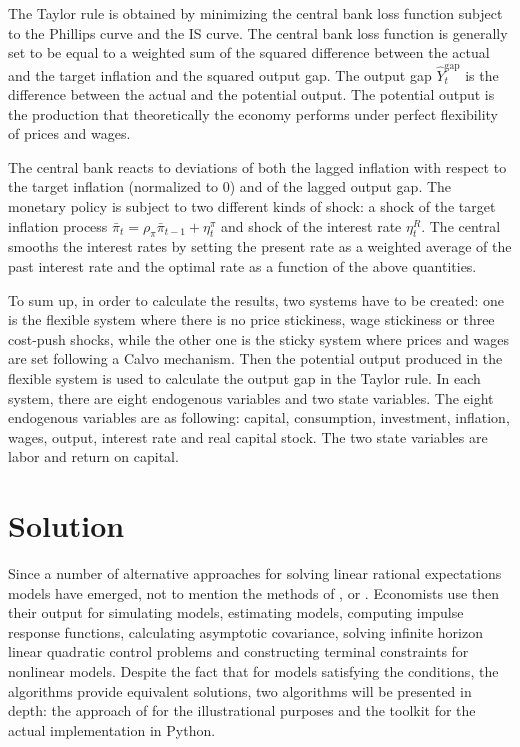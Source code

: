 \documentclass{pracamgr}
\numberwithin{equation}{section}
\begin{document}
The Taylor rule is obtained by minimizing the central bank loss function subject to the Phillips curve and the IS curve. The central bank loss function is generally set to be equal to a weighted sum of the squared difference between the actual and the target inflation and the squared output gap. The output gap $\hat{Y}_{t}^{\text{gap}}$ is the difference between the actual and the potential output. The potential output is the production that theoretically the economy performs under perfect flexibility of prices and wages.

The central bank reacts to deviations of both the lagged inflation with respect to the target inflation (normalized to 0) and of the lagged output gap. The monetary policy is subject to two different kinds of shock: a shock of the target inflation process $ \bar{\pi}_{t} = \rho_{\pi} \bar{\pi}_{t-1} + \eta_{t}^{\pi}$ and shock
of the interest rate $\eta_{t}^{R}$. The central smooths the interest rates by setting the present rate as a weighted average of the past interest rate and the optimal rate as a function of the above quantities.

To sum up, in order to calculate the results, two systems have to be created: one is the flexible system where there is no price stickiness, wage stickiness or three cost-push shocks, while the other one is the sticky system where prices and wages are set following a Calvo mechanism. Then the potential output produced in the flexible system is used to calculate the output gap in the Taylor rule. In each system, there are eight endogenous variables and two state variables. The eight endogenous variables are as following: capital, consumption, investment, inflation, wages, output, interest rate and real capital stock. The two state variables are labor and return on capital.

\section{Solution}

Since \citet{blanchard1980solution} a number of alternative approaches for solving linear rational expectations models have emerged, not to mention the methods of \citet{uhlig1998toolkit}, \citet{klein2000using} or \citet{sims2002solving}. Economists use then their output for simulating models, estimating models, computing impulse response functions, calculating asymptotic covariance, solving infinite horizon linear quadratic control problems and constructing terminal constraints for nonlinear models. Despite the fact that for models satisfying the \citet{blanchard1980solution} conditions, the algorithms provide equivalent solutions, two algorithms will be presented in depth: the approach of \citet{klein2000using} for the illustrational purposes and the \citet{uhlig1998toolkit} toolkit for the actual implementation in Python.
\end{document}
